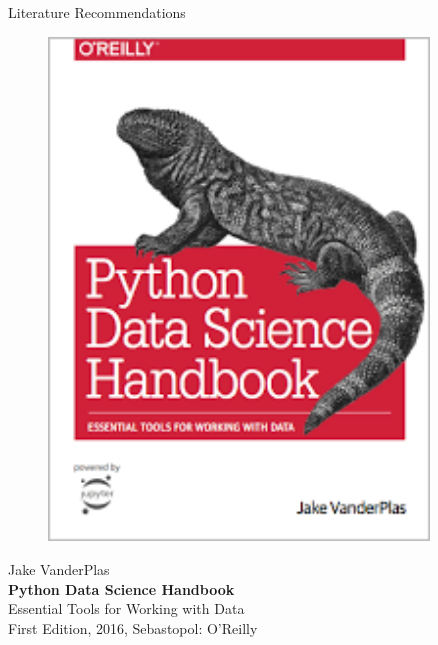 \documentclass[main.tex]{subfiles}
\begin{document}
\begin{frame}{Literature Recommendations}
\begin{minipage}{0.1\textwidth}
\begin{figure}[H]
                \includegraphics[height=0.2\textheight, width=0.9\textwidth, left]{assets/book-covers/vanderplas2016.png}
            \end{figure}
        \end{minipage}
        \begin{minipage}{0.39\textwidth}
            \footnotesize Jake VanderPlas \normalsize \\[-0.5mm]
            \small \textbf{Python Data Science Handbook} \\[-0.8mm]
            Essential Tools for Working with Data \normalsize \\
            \tiny First Edition, 2016, Sebastopol: O'Reilly \normalsize
        \end{minipage}
        

\end{frame}
\end{document}
